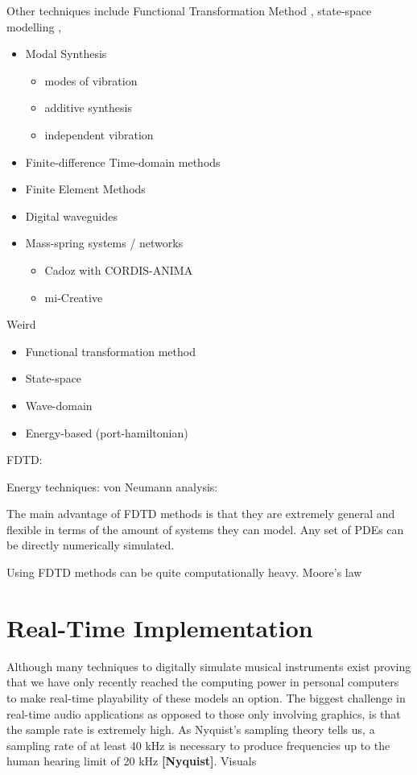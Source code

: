 Other techniques include Functional Transformation Method \cite{Trautmann2003}, state-space modelling \cite{Matignon1992}, 

\begin{itemize}
    \item Modal Synthesis
    \begin{itemize}
        \item modes of vibration
        \item additive synthesis
        \item independent vibration
    \end{itemize}
    \item Finite-difference Time-domain methods
    \item Finite Element Methods
    \item Digital waveguides
    \item Mass-spring systems / networks 
    \begin{itemize}
        \item Cadoz with CORDIS-ANIMA
        \item mi-Creative
    \end{itemize}
\end{itemize}
Weird
\begin{itemize}
    \item Functional transformation method
    \item State-space
    \item Wave-domain
    \item Energy-based (port-hamiltonian)
\end{itemize}
    
FDTD: 

Energy techniques: \cite{Gustafsson2013}
von Neumann analysis: \cite{Strikwerda1989}


The main advantage of FDTD methods is that they are extremely general and flexible in terms of  the amount of systems they can model. Any set of PDEs can be directly numerically simulated. 

Using FDTD methods can be quite computationally heavy. 
Moore's law \cite{Moore1965}

\section{Real-Time Implementation}
Although many techniques to digitally simulate musical instruments exist
proving that we have only recently reached the computing power in personal computers to make real-time playability of these models an option. The biggest challenge in real-time audio applications as opposed to those only involving graphics, is that the sample rate is extremely high. As Nyquist's sampling theory tells us, a sampling rate of at least 40 kHz is necessary to produce frequencies up to the human hearing limit of 20 kHz \textbf{[Nyquist]}. Visuals 

